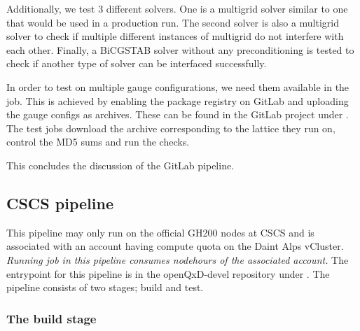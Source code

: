 Additionally, we test $3$ different solvers. One is a multigrid solver similar to one that would be used in a production run. The second solver is also a multigrid solver to check if multiple different instances of multigrid do not interfere with each other. Finally, a BiCGSTAB solver without any preconditioning is tested to check if another type of solver can be interfaced successfully.

In order to test on multiple gauge configurations, we need them available in the job. This is achieved by enabling the package registry on GitLab and uploading the gauge configs as  archives. These can be found in the GitLab project under . The test jobs download the archive corresponding to the lattice they run on, control the MD5 sums and run the checks.

This concludes the discussion of the GitLab pipeline.

\subsection{CSCS pipeline}
\label{sec:cicd:pipeline:cscs}

This pipeline may only run on the official GH200 nodes at CSCS and is associated with an account having compute quota on the Daint Alps vCluster. \emph{Running job in this pipeline consumes nodehours of the associated account.} The entrypoint for this pipeline is in the openQxD-devel repository\cite{gitlab:openqxd-devel} under . The pipeline consists of two stages; build and test.

\subsubsection{The build stage}


